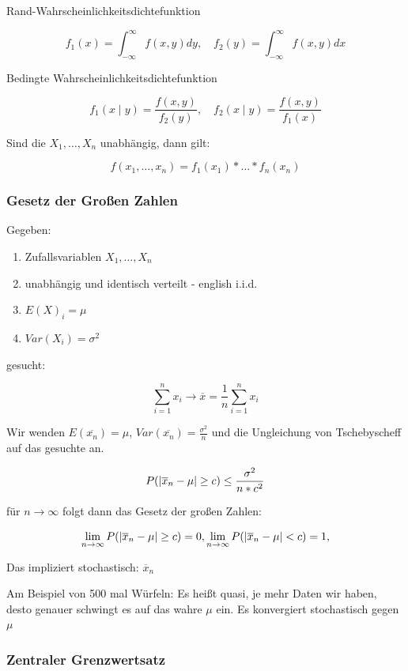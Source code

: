 \documentclass[a4paper]{article}
\begin{document}
Rand-Wahrscheinlichkeitsdichtefunktion

\[
f_1(x) = \int_{-\infty}^{\infty} f(x, y) dy, \quad
f_2(y) = \int_{-\infty}^{\infty} f(x, y) dx
\]

Bedingte Wahrscheinlichkeitsdichtefunktion

\[
f_1(x \mid y) = \frac{f(x, y)}{f_2(y)}, \quad
f_2(x \mid y) = \frac{f(x, y)}{f_1(x)}
\]

Sind die $X_1, \dots, X_n$ unabhängig, dann gilt:

\[
f(x_1, \dots, x_n) = f_1(x_1) * \dots * f_n(x_n)
\]

\subsubsection{Gesetz der Großen Zahlen}

Gegeben:

\begin{enumerate}
    \item Zufallsvariablen $X_1, \dots, X_n$
    \item unabhängig und identisch verteilt - english i.i.d.
    \item $E(X)_i=\mu$
    \item $Var(X_i)=\sigma^2$
\end{enumerate}

gesucht:

\[
\sum_{i=1}^{n} x_i \rightarrow \overline{x} = \frac{1}{n} \sum_{i=1}^{n}x_i
\]

Wir wenden $E(\overline{x_n})=\mu$, $Var(\overline{x_n}) = \frac{\sigma^2}{n}$ und die Ungleichung von Tschebyscheff auf das gesuchte an.

\[
P(\left\lvert \overline{x}_n - \mu \right\rvert \geq c) \leq \frac{\sigma^2}{n*c^2}
\]

für $n \rightarrow \infty$ folgt dann das Gesetz der großen Zahlen:

\[
\lim_{n\to\infty} P(\left\lvert \overline{x}_n - \mu \right\rvert \geq c) = 0,
\lim_{n\to\infty} P(\left\lvert \overline{x}_n - \mu \right\rvert < c) = 1,
\]

Das impliziert stochastisch: $\overline{x}_n$

Am Beispiel von 500 mal Würfeln: Es heißt quasi, je mehr Daten wir haben, desto genauer schwingt es auf das wahre $\mu$ ein. Es konvergiert stochastisch gegen $\mu$


\subsubsection{Zentraler Grenzwertsatz}
\end{document}
